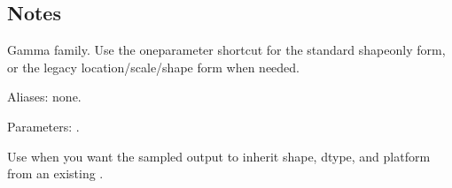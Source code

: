 \documentclass[letterpaper,10pt,english]{sphinxmanual}
\begin{document}
\begin{sphinxVerbatim}[commandchars=\\\{\}]
\end{sphinxVerbatim}


\subsection{Notes}
\label{\detokenize{distribution_catalog:id65}}
\sphinxAtStartPar
Gamma family. Use the one\sphinxhyphen{}parameter shortcut for the standard shape\sphinxhyphen{}only form, or the legacy location/scale/shape form when needed.

\sphinxAtStartPar
Aliases: none.

\sphinxAtStartPar
Parameters: .

\sphinxAtStartPar
Use  when you want the sampled output to inherit shape, dtype, and platform from an existing .
\end{document}
